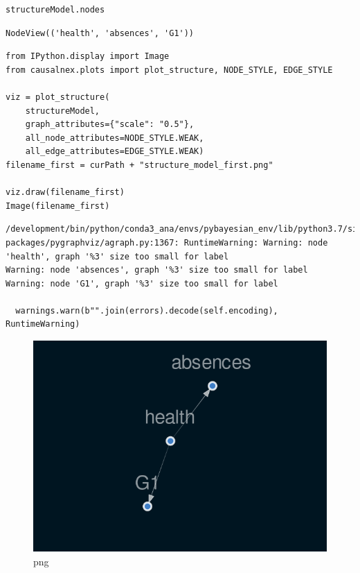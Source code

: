 \documentclass[
]{article}
\begin{document}
\begin{verbatim}
structureModel.nodes
\end{verbatim}

\begin{verbatim}
NodeView(('health', 'absences', 'G1'))
\end{verbatim}

\begin{verbatim}
from IPython.display import Image
from causalnex.plots import plot_structure, NODE_STYLE, EDGE_STYLE

viz = plot_structure(
    structureModel,
    graph_attributes={"scale": "0.5"},
    all_node_attributes=NODE_STYLE.WEAK,
    all_edge_attributes=EDGE_STYLE.WEAK)
filename_first = curPath + "structure_model_first.png"

viz.draw(filename_first)
Image(filename_first)
\end{verbatim}

\begin{verbatim}
/development/bin/python/conda3_ana/envs/pybayesian_env/lib/python3.7/site-packages/pygraphviz/agraph.py:1367: RuntimeWarning: Warning: node 'health', graph '%3' size too small for label
Warning: node 'absences', graph '%3' size too small for label
Warning: node 'G1', graph '%3' size too small for label

  warnings.warn(b"".join(errors).decode(self.encoding), RuntimeWarning)
\end{verbatim}

\begin{figure}
\centering
\includegraphics{FirstCausalNexTutorial_files/FirstCausalNexTutorial_10_1.png}
\caption{png}
\end{figure}
\end{document}
